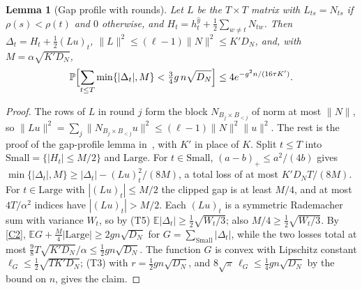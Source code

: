 \documentclass[11pt,a4paper]{article}
\newtheorem{lemma}[theorem]{Lemma}
\theoremstyle{definition}
\theoremstyle{remark}
\newcommand{\E}{\mathbb E}
\newcommand{\Prb}{\mathbb P}
\begin{document}
\begin{lemma}[Gap profile with rounds]\label{lem:profile}
Let $L$ be the $T\times T$ matrix with $L_{ts}=N_{ts}$ if $\rho(s)<\rho(t)$ and
$0$ otherwise, and $H_t=h^{\hat y}_t+\frac12\sum_{w\ne t}N_{tw}$. Then
$\Delta_t=H_t+\frac12(Lu)_t$, $\|L\|^2\le(\ell-1)\|N\|^2\le K'D_N$, and, with
$M=\alpha\sqrt{K'D_N}$,
\[
 \Prb\Bigl[\sum_{t\le T}\min\{|\Delta_t|,M\}<\tfrac34g\,n\sqrt{D_N}\Bigr]
 \le4e^{-g^2n/(16\tau K')}.
\]
\end{lemma}
\begin{proof}
The rows of $L$ in round $j$ form the block $N_{B_j\times B_{<j}}$ of norm at most
$\|N\|$, so $\|Lu\|^2=\sum_j\|N_{B_j\times B_{<j}}u\|^2\le(\ell-1)\|N\|^2\|u\|^2$.
The rest is the proof of the gap-profile lemma in~\cite{CG}, with $K'$ in place of
$K$. Split $t\le T$ into $\mathrm{Small}=\{|H_t|\le M/2\}$ and $\mathrm{Large}$.
For $t\in\mathrm{Small}$, $(a-b)_+\le a^2/(4b)$ gives
$\min\{|\Delta_t|,M\}\ge|\Delta_t|-(Lu)_t^2/(8M)$, a total loss of at most
$K'D_NT/(8M)$. For $t\in\mathrm{Large}$ with $|(Lu)_t|\le M/2$ the clipped gap is
at least $M/4$, and at most $4T/\alpha^2$ indices have $|(Lu)_t|>M/2$. Each
$(Lu)_t$ is a symmetric Rademacher sum with variance $W_t$, so by (T5)
$\E|\Delta_t|\ge\frac12\sqrt{W_t/3}$; also $M/4\ge\frac12\sqrt{W_t/3}$. By
\eqref{C2}, $\E G+\frac M4|\mathrm{Large}|\ge2gn\sqrt{D_N}$ for
$G=\sum_{\mathrm{Small}}|\Delta_t|$, while the two losses total at most
$\frac98T\sqrt{K'D_N}/\alpha\le\frac12gn\sqrt{D_N}$. The function $G$ is convex
with Lipschitz constant $\ell_G\le\frac12\sqrt{TK'D_N}$; (T3) with
$r=\frac12gn\sqrt{D_N}$, and $8\sqrt\pi\,\ell_G\le\frac14gn\sqrt{D_N}$ by the
bound on $n$, gives the claim.
\end{proof}
\end{document}
